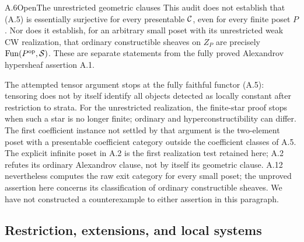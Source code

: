 \begin{statement}{A.6}{Open}{The unrestricted geometric clauses}
This audit does not establish that (A.5) is essentially surjective for
every presentable $\mathcal C$, even for every finite poset $P$. Nor does it
establish, for an arbitrary small poset with its unrestricted weak CW
realization, that ordinary constructible sheaves on $Z_P$ are precisely
$\operatorname{Fun}(P^{\mathrm{op}},\mathcal S)$. These are separate statements from the fully
proved Alexandrov hypersheaf assertion A.1.
\end{statement}
The attempted tensor argument stops at the fully faithful functor (A.5):
tensoring does not by itself identify all objects detected as locally
constant after restriction to strata. For the unrestricted realization,
the finite-star proof stops when such a star is no longer finite; ordinary
and hyperconstructibility can differ. The first coefficient instance not
settled by that argument is the two-element poset with a presentable
coefficient category outside the coefficient classes of A.5. The explicit
infinite poset in A.2 is the first realization test retained here; A.2
refutes its ordinary Alexandrov clause, not by itself its geometric clause.
A.12 nevertheless computes the raw exit category for every small poset;
the unproved assertion here concerns its classification of ordinary
constructible sheaves.
We have not constructed a counterexample to either assertion in this
paragraph.

\subsection{Restriction, extensions, and local systems}

